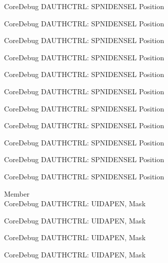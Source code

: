 \begin{DoxyRefList}
\label{deprecated__deprecated000435}%
%
Core\+Debug DAUTHCTRL\+: SPNIDENSEL Position 

\label{deprecated__deprecated000538}%
%
Core\+Debug DAUTHCTRL\+: SPNIDENSEL Position 

\label{deprecated__deprecated000640}%
%
Core\+Debug DAUTHCTRL\+: SPNIDENSEL Position 

\label{deprecated__deprecated000746}%
%
Core\+Debug DAUTHCTRL\+: SPNIDENSEL Position 

\label{deprecated__deprecated000800}%
%
Core\+Debug DAUTHCTRL\+: SPNIDENSEL Position 

\label{deprecated__deprecated000876}%
%
Core\+Debug DAUTHCTRL\+: SPNIDENSEL Position 

\label{deprecated__deprecated000939}%
%
Core\+Debug DAUTHCTRL\+: SPNIDENSEL Position 

\label{deprecated__deprecated001018}%
%
Core\+Debug DAUTHCTRL\+: SPNIDENSEL Position 

\label{deprecated__deprecated001094}%
%
Core\+Debug DAUTHCTRL\+: SPNIDENSEL Position 

\label{deprecated__deprecated001197}%
%
Core\+Debug DAUTHCTRL\+: SPNIDENSEL Position 

\label{deprecated__deprecated001299}%
%
Core\+Debug DAUTHCTRL\+: SPNIDENSEL Position  
\item[Member \doxylink{group___c_m_s_i_s___s_c_b_gad69e7195bbc5074466387d9c4d8bd529}{Core\+Debug\+\_\+\+DAUTHCTRL\+\_\+\+UIDAPEN\+\_\+\+Msk} ]\hfill \\
\label{deprecated__deprecated000082}%
%
Core\+Debug DAUTHCTRL\+: UIDAPEN, Mask 

\label{deprecated__deprecated000533}%
%
Core\+Debug DAUTHCTRL\+: UIDAPEN, Mask 

\label{deprecated__deprecated000635}%
%
Core\+Debug DAUTHCTRL\+: UIDAPEN, Mask 

\label{deprecated__deprecated000741}%
%
Core\+Debug DAUTHCTRL\+: UIDAPEN, Mask 


\end{DoxyRefList}
